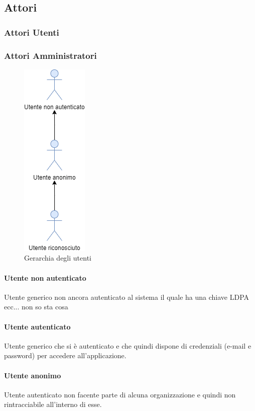 \subsection{Attori}
\subsubsection{Attori Utenti}

\subsubsection{Attori Amministratori}
\begin{figure}[h]
  \caption{Gerarchia degli utenti}
  \centering
    \includegraphics[scale=0.6]{sezioni/UseCase/Immagini/Utenti.png}
\end{figure}

\paragraph{Utente non autenticato}
Utente generico non ancora autenticato al sistema il quale ha una chiave LDPA ecc... non so sta cosa
\paragraph{Utente autenticato}
Utente generico che si è autenticato e che quindi dispone di credenziali (e-mail e password) per accedere all'applicazione.
\paragraph{Utente anonimo}
Utente autenticato non facente parte di alcuna organizzazione e quindi non rintracciabile all'interno di esse.

